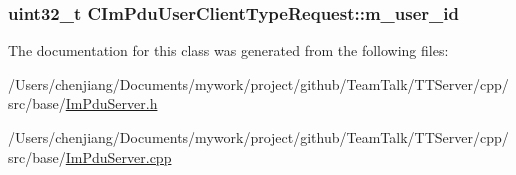 \subsubsection[{m\+\_\+user\+\_\+id}]{\setlength{\rightskip}{0pt plus 5cm}uint32\+\_\+t C\+Im\+Pdu\+User\+Client\+Type\+Request\+::m\+\_\+user\+\_\+id\hspace{0.3cm}{\ttfamily [private]}}\label{class_c_im_pdu_user_client_type_request_a72db5be18f93d221848422a5a14b96bc}


The documentation for this class was generated from the following files\+:\begin{DoxyCompactItemize}
\item 
/\+Users/chenjiang/\+Documents/mywork/project/github/\+Team\+Talk/\+T\+T\+Server/cpp/src/base/\hyperlink{_im_pdu_server_8h}{Im\+Pdu\+Server.\+h}\item 
/\+Users/chenjiang/\+Documents/mywork/project/github/\+Team\+Talk/\+T\+T\+Server/cpp/src/base/\hyperlink{_im_pdu_server_8cpp}{Im\+Pdu\+Server.\+cpp}\end{DoxyCompactItemize}
